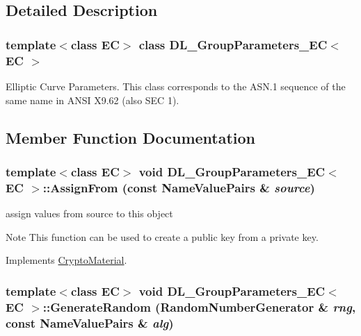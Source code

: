 \subsection{Detailed Description}
\subsubsection*{template$<$class EC$>$ class DL\_\-GroupParameters\_\-EC$<$ EC $>$}

Elliptic Curve Parameters. This class corresponds to the ASN.1 sequence of the same name in ANSI X9.62 (also SEC 1). 

\subsection{Member Function Documentation}
\hypertarget{class_d_l___group_parameters___e_c_a8fa1181ce7cf91f12ba6de286d1da5bd}{
\subsubsection[{AssignFrom}]{\setlength{\rightskip}{0pt plus 5cm}template$<$class EC$>$ void {\bf DL\_\-GroupParameters\_\-EC}$<$ EC $>$::AssignFrom (const {\bf NameValuePairs} \& {\em source})}}
\label{class_d_l___group_parameters___e_c_a8fa1181ce7cf91f12ba6de286d1da5bd}


assign values from source to this object \begin{DoxyNote}{Note}
This function can be used to create a public key from a private key. 
\end{DoxyNote}


Implements \hyperlink{class_crypto_material_a20181c1b39a74a9fe91385b025b773c6}{CryptoMaterial}.\hypertarget{class_d_l___group_parameters___e_c_a519a33d073fe5bf2f278a0de75a404ab}{
\subsubsection[{GenerateRandom}]{\setlength{\rightskip}{0pt plus 5cm}template$<$class EC$>$ void {\bf DL\_\-GroupParameters\_\-EC}$<$ EC $>$::GenerateRandom ({\bf RandomNumberGenerator} \& {\em rng}, \/  const {\bf NameValuePairs} \& {\em alg})}}
\label{class_d_l___group_parameters___e_c_a519a33d073fe5bf2f278a0de75a404ab}


